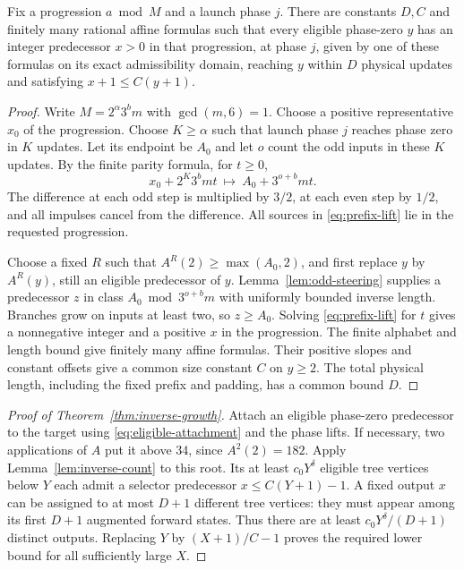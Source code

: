 \begin{lemma}\label{lem:finite-selector}
Fix a progression $a\bmod M$ and a launch phase $j$. There are constants
$D,C$ and finitely many rational affine formulas such that every eligible
phase-zero $y$ has an integer predecessor $x>0$ in that progression, at
phase $j$, given by one of these formulas on its exact admissibility
domain, reaching $y$ within $D$ physical updates and satisfying
$x+1\le C(y+1)$.
\end{lemma}
\begin{proof}
Write $M=2^\alpha3^bm$ with $\gcd(m,6)=1$. Choose a positive
representative $x_0$ of the progression. Choose $K\ge\alpha$ such that
launch phase $j$ reaches phase
zero in $K$ updates. Let its endpoint be $A_0$ and let $o$ count the odd
inputs in these $K$ updates. By the finite parity formula, for $t\ge0$,
\begin{equation}\label{eq:prefix-lift}
 x_0+2^K3^bmt\ \longmapsto\ A_0+3^{o+b}mt.
\end{equation}
The difference at each odd step is multiplied by $3/2$, at each even
step by $1/2$, and all impulses cancel from the difference. All sources
in \eqref{eq:prefix-lift} lie in the requested progression.

Choose a fixed $R$ such that $A^R(2)\ge\max(A_0,2)$, and first replace
$y$ by $A^R(y)$, still an eligible predecessor of $y$.
Lemma~\ref{lem:odd-steering} supplies a predecessor $z$ in class
$A_0\bmod3^{o+b}m$ with uniformly bounded inverse length. Branches grow
on inputs at least two, so $z\ge A_0$. Solving \eqref{eq:prefix-lift}
for $t$ gives a nonnegative integer and a positive $x$ in the progression.
The finite alphabet and length bound give finitely many affine formulas.
Their positive slopes and constant offsets give a common size constant
$C$ on $y\ge2$. The total physical length, including the fixed prefix
and padding, has a common bound $D$.
\end{proof}

\begin{proof}[Proof of Theorem~\ref{thm:inverse-growth}]
Attach an eligible phase-zero predecessor to the target using
\eqref{eq:eligible-attachment} and the phase lifts. If necessary, two
applications of $A$ put it above 34, since $A^2(2)=182$. Apply
Lemma~\ref{lem:inverse-count} to this root. Its at least $c_0Y^\delta$
eligible tree vertices below $Y$ each admit a selector predecessor
$x\le C(Y+1)-1$. A fixed output $x$ can be assigned to at most $D+1$
different tree vertices: they must appear among its first $D+1$ augmented
forward states. Thus there are at least $c_0Y^\delta/(D+1)$ distinct
outputs. Replacing $Y$ by $(X+1)/C-1$ proves the required lower bound
for all sufficiently large $X$.
\end{proof}

